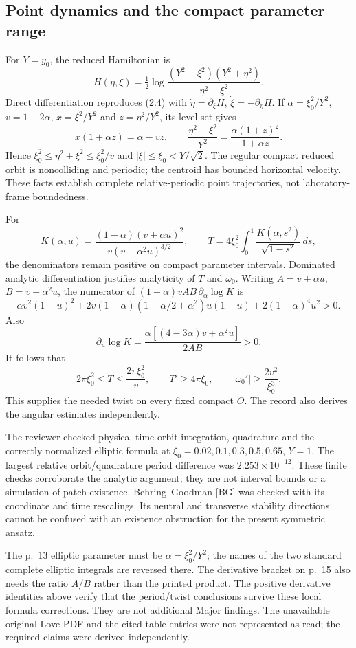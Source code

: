 \documentclass[10pt]{article}
\begin{document}
\subsection*{Point dynamics and the compact parameter range}
For \(Y=y_0\), the reduced Hamiltonian is \[H(\eta,\xi)=\tfrac12\log
       \frac{(Y^2-\xi^2)(Y^2+\eta^2)}{\eta^2+\xi^2}.\] Direct differentiation reproduces (2.4) with \(\dot\eta=\partial_\xi H\), \(\dot\xi=-\partial_\eta H\). If \(\alpha=\xi_0^2/Y^2\), \(v=1-2\alpha\), \(x=\xi^2/Y^2\) and \(z=\eta^2/Y^2\), its level set gives \[x(1+\alpha z)=\alpha-vz,\qquad
 \frac{\eta^2+\xi^2}{Y^2}
       =\frac{\alpha(1+z)^2}{1+\alpha z}.\] Hence \(\xi_0^2\le\eta^2+\xi^2\le\xi_0^2/v\) and \(|\xi|\le\xi_0<Y/\sqrt2\). The regular compact reduced orbit is noncolliding and periodic; the centroid has bounded horizontal velocity. These facts establish complete relative-periodic point trajectories, not laboratory-frame boundedness.\par
For \[K(\alpha,u)=
 \frac{(1-\alpha)(v+\alpha u)^2}
      {v(v+\alpha^2u)^{3/2}},\qquad
 T=4\xi_0^2\int_0^1\frac{K(\alpha,s^2)}{\sqrt{1-s^2}}\,ds ,\] the denominators remain positive on compact parameter intervals. Dominated analytic differentiation justifies analyticity of \(T\) and \(\omega_0\). Writing \(A=v+\alpha u\), \(B=v+\alpha^2u\), the numerator of \((1-\alpha)vAB\,\partial_\alpha\log K\) is \[\alpha v^2(1-u)^2+
 2v(1-\alpha)(1-\alpha/2+\alpha^2)u(1-u)
 +2(1-\alpha)^4u^2>0.\] Also \[\partial_u\log K
   =\frac{\alpha[(4-3\alpha)v+\alpha^2u]}{2AB}>0 .\] It follows that \[2\pi\xi_0^2\le T\le\frac{2\pi\xi_0^2}{v},\qquad
 T'\ge4\pi\xi_0,\qquad
 |\omega_0'|\ge\frac{2v^2}{\xi_0^3}.\] This supplies the needed twist on every fixed compact \(O\). The record also derives the angular estimates independently.\par
The reviewer checked physical-time orbit integration, quadrature and the correctly normalized elliptic formula at \(\xi_0=0.02,0.1,0.3,0.5,0.65\), \(Y=1\). The largest relative orbit/quadrature period difference was \(2.253\times10^{-12}\). These finite checks corroborate the analytic argument; they are not interval bounds or a simulation of patch existence. Behring–Goodman [BG] was checked with its coordinate and time rescalings. Its neutral and transverse stability directions cannot be confused with an existence obstruction for the present symmetric ansatz.\par
The p. 13 elliptic parameter must be \(\alpha=\xi_0^2/Y^2\); the names of the two standard complete elliptic integrals are reversed there. The derivative bracket on p. 15 also needs the ratio \(A/B\) rather than the printed product. The positive derivative identities above verify that the period/twist conclusions survive these local formula corrections. They are not additional Major findings. The unavailable original Love PDF and the cited table entries were not represented as read; the required claims were derived independently.\par
\end{document}
